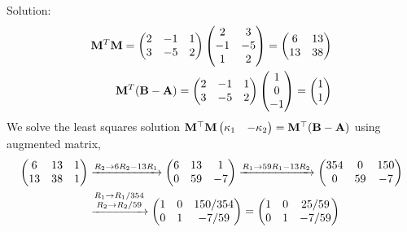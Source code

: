 \documentclass{beamer}
\begin{document}
\begin{frame}{Solution: }
\noindent
\begin{align}
    \mathbf{M}^T\mathbf{M} = \begin{pmatrix}2 & -1 & 1 \\ 3 & -5 & 2\end{pmatrix} \begin{pmatrix}2 & 3 \\ -1 & -5 \\ 1 & 2\end{pmatrix} = \begin{pmatrix}6 & 13 \\ 13 & 38\end{pmatrix} \\
    \mathbf{M}^T(\mathbf{B} - \mathbf{A}) = \begin{pmatrix}2 & -1 & 1 \\ 3 & -5 & 2\end{pmatrix} \begin{pmatrix}1 \\ 0 \\ -1\end{pmatrix} = \begin{pmatrix}1 \\ 1\end{pmatrix}
\end{align}
We solve the least squares solution $\mathbf{M}^\top\mathbf{M}\begin{pmatrix}\kappa_1 & -\kappa_2\end{pmatrix} = \mathbf{M}^\top(\mathbf{B} - \mathbf{A})$ using augmented matrix,
\begin{align*}
    \begin{pmatrix}6 & 13 & 1 \\ 13 & 38 & 1\end{pmatrix} 
    &\xrightarrow{R_2 \to 6R_2 - 13R_1} \begin{pmatrix}6 & 13 & 1 \\ 0 & 59 & -7\end{pmatrix} 
    \xrightarrow{R_1 \to 59R_1 - 13R_2} \begin{pmatrix}354 & 0 & 150 \\ 0 & 59 & -7\end{pmatrix} \\
    &\xrightarrow{\substack{R_1 \to R_1/354 \\ R_2 \to R_2/59}} \begin{pmatrix}1 & 0 & 150/354 \\ 0 & 1 & -7/59\end{pmatrix} 
    = \begin{pmatrix}1 & 0 & 25/59 \\ 0 & 1 & -7/59\end{pmatrix}
\end{align*}
\end{frame}
\end{document}
